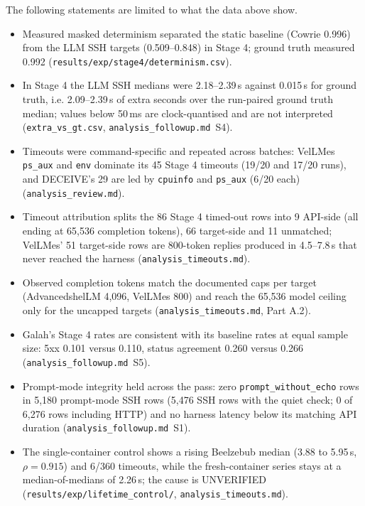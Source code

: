 \documentclass[a4paper,11pt]{article}
\begin{document}
The following statements are limited to what the data above show.

\begin{itemize}[leftmargin=*]
\item Measured masked determinism separated the static baseline (Cowrie 0.996)
  from the LLM SSH targets (0.509--0.848) in Stage 4; ground truth measured
  0.992 (\texttt{results/exp/stage4/\allowbreak{}determinism.csv}).
\item In Stage 4 the LLM SSH medians were 2.18--2.39\,s against 0.015\,s for
  ground truth, i.e. 2.09--2.39\,s of extra seconds over the run-paired ground
  truth median; values below 50\,ms are clock-quantised and are not
  interpreted (\texttt{extra\_vs\_gt.csv}, \texttt{analysis\_followup.md}~S4).
\item Timeouts were command-specific and repeated across batches: VelLMes
  \texttt{ps\_aux} and \texttt{env} dominate its 45 Stage 4 timeouts (19/20 and
  17/20 runs), and DECEIVE's 29 are led by \texttt{cpuinfo} and \texttt{ps\_aux}
  (6/20 each) (\texttt{analysis\_review.md}).
\item Timeout attribution splits the 86 Stage 4 timed-out rows into 9 API-side
  (all ending at 65,536 completion tokens), 66 target-side and 11 unmatched;
  VelLMes' 51 target-side rows are 800-token replies produced in 4.5--7.8\,s
  that never reached the harness (\texttt{analysis\_timeouts.md}).
\item Observed completion tokens match the documented caps per target
  (AdvancedshelLM 4,096, VelLMes 800) and reach the 65,536 model ceiling only
  for the uncapped targets (\texttt{analysis\_timeouts.md}, Part A.2).
\item Galah's Stage 4 rates are consistent with its baseline rates at equal
  sample size: 5xx 0.101 versus 0.110, status agreement 0.260 versus 0.266
  (\texttt{analysis\_followup.md}~S5).
\item Prompt-mode integrity held across the pass: zero
  \texttt{prompt\_without\_echo} rows in 5,180 prompt-mode SSH rows (5,476 SSH
  rows with the quiet check; 0 of 6,276 rows including HTTP) and no harness
  latency below its matching API duration (\texttt{analysis\_followup.md}~S1).
\item The single-container control shows a rising Beelzebub median
  (3.88 to 5.95\,s, $\rho=0.915$) and 6/360 timeouts, while the fresh-container
  series stays at a median-of-medians of 2.26\,s; the cause is UNVERIFIED
  (\texttt{results/exp/lifetime\_control/}, \texttt{analysis\_timeouts.md}).
\end{itemize}
\end{document}

